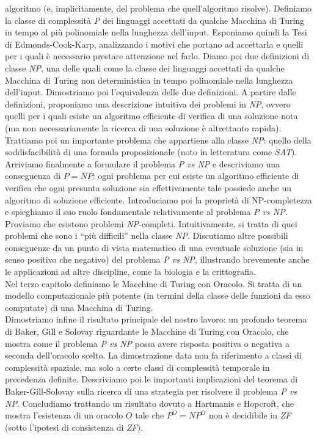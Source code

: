 \documentclass[12pt,a4paper]{report}
\theoremstyle{definition}
\begin{document}
algoritmo (e, implicitamente, del problema che quell'algoritmo risolve). Definiamo la classe di complessità \emph{P} dei linguaggi accettati da qualche Macchina di Turing in tempo al più polinomiale nella lunghezza dell'input. Esponiamo quindi la Tesi di Edmonds-Cook-Karp, analizzando i motivi che portano ad accettarla e quelli per i quali è necessario prestare attenzione nel farlo. Diamo poi due definizioni di classe \emph{NP}, una delle quali come la classe dei linguaggi accettati da qualche Macchina di Turing non deterministica in tempo polinomiale nella lunghezza dell'input. Dimostriamo poi l'equivalenza delle due definizioni. A partire dalle definizioni, proponiamo una descrizione intuitiva dei problemi in \emph{NP}, ovvero quelli per i quali esiste un algoritmo efficiente di verifica di una soluzione nota (ma non necessariamente la ricerca di una soluzione è altrettanto rapida). Trattiamo poi un importante problema che appartiene alla classe \emph{NP}: quello della soddisfacibilità di una formula proposizionale (noto in letteratura come \emph{SAT}). Arriviamo finalmente a formulare il problema \emph{P vs NP} e descriviamo una conseguenza di $P=NP$: ogni problema per cui esiste un algoritmo efficiente di verifica che ogni presunta soluzione sia effettivamente tale possiede anche un algoritmo di soluzione efficiente. Introduciamo poi la proprietà di NP-completezza e spieghiamo il suo ruolo fondamentale relativamente al problema \emph{P vs NP}. Proviamo che esistono problemi \emph{NP}-completi. Intuitivamente, si tratta di quei problemi che sono i ``più difficili'' nella classe \emph{NP}. Discutiamo altre possibili conseguenze da un punto di vista matematico di una eventuale soluzione (sia in senso positivo che negativo) del problema \emph{P vs NP}, illustrando brevemente anche le applicazioni ad altre discipline, come la biologia e la crittografia.\\
Nel terzo capitolo definiamo le Macchine di Turing con Oracolo. Si tratta di un modello computazionale più potente (in termini della classe delle funzioni da esso computate) di una Macchina di Turing.\\
Dimostriamo infine il risultato principale del nostro lavoro: un profondo teorema di Baker, Gill e Solovay riguardante le Macchine di Turing con Oracolo, che mostra come il problema \emph{P vs NP} possa avere risposta positiva o negativa a seconda dell'oracolo scelto. La dimostrazione data non fa riferimento a classi di complessità spaziale, ma solo a certe classi di complessità temporale in precedenza definite. Descriviamo poi le importanti implicazioni del teorema di Baker-Gill-Solovay sulla ricerca di una strategia per risolvere il problema \emph{P vs NP}. Concludiamo trattando un risultato dovuto a Hartmanis e Hopcroft, che mostra l'esistenza di un oracolo $O$ tale che $P^O=NP^O$ non è decidibile in \emph{ZF} (sotto l'ipotesi di consistenza di \emph{ZF}).
\end{document}
